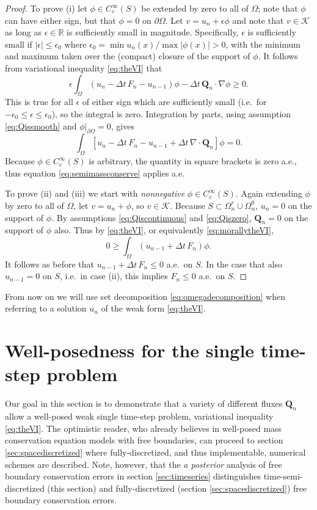 \documentclass[final,leqno,onefignum,onetabnum]{siamltex1213bueler}
\newcommand\bQ{\mathbf{Q}}
\newcommand{\Div}{\nabla\cdot}
\newcommand\eps{\epsilon}
\renewcommand{\grad}{\nabla}
\newcommand\RR{\mathbb{R}}
\begin{document}
\medskip
\begin{proof}  To prove (i) let $\phi\in C_c^\infty(S)$ be extended by zero to all of $\Omega$; note that $\phi$ can have either sign, but that $\phi=0$ on $\partial\Omega$.  Let $v = u_n + \eps \phi$ and note that $v \in \mathcal{K}$ as long as $\eps\in\RR$ is sufficiently small in magnitude.  Specifically, $\eps$ is sufficiently small if $|\eps|\le \eps_0$ where $\eps_0 = \min u_n(x) / \max |\phi(x)| > 0$, with the minimum and maximum taken over the (compact) closure of the support of $\phi$.  It follows from variational inequality \eqref{eq:theVI} that
   $$\eps \int_\Omega \left(u_n - \Delta t\,F_n - u_{n-1}\right)\phi - \Delta t\,\bQ_n \cdot \grad \phi \ge 0.$$
This is true for all $\eps$ of either sign which are sufficiently small (i.e.~for $-\eps_0 \le \eps \le \eps_0$), so the integral is zero.  Integration by parts, using assumption \eqref{eq:Qissmooth} and $\phi\big|_{\partial\Omega}=0$, gives
   $$\int_\Omega \left[ u_n - \Delta t\,F_n - u_{n-1} + \Delta t\,\Div\bQ_n \right]\phi = 0.$$
Because $\phi\in C_c^\infty(S)$ is arbitrary, the quantity in square brackets is zero a.e., thus equation \eqref{eq:semimassconserve} applies a.e.

To prove (ii) and (iii) we start with \emph{nonnegative} $\phi\in C_c^\infty(S)$.  Again extending $\phi$ by zero to all of $\Omega$, let $v = u_n + \phi$, so $v\in\mathcal{K}$.  Because $S\subset \Omega_n^r\cup\Omega_n^0$, $u_n=0$ on the support of $\phi$.  By assumptions \eqref{eq:Qiscontinuous} and \eqref{eq:Qiszero}, $\bQ_n=0$ on the support of $\phi$ also.  Thus by \eqref{eq:theVI}, or equivalently \eqref{eq:morallytheVI},
    $$0 \ge \int_{\Omega} \left(u_{n-1} + \Delta t\, F_n\right) \phi.$$
It follows as before that $u_{n-1} + \Delta t\, F_n \le 0$ a.e.~on $S$.  In the case that also $u_{n-1}=0$ on $S$, i.e.~in case (ii), this implies $F_n \le 0$ a.e.~on $S$.\end{proof}

\medskip
From now on we will use set decomposition \eqref{eq:omegadecomposition} when referring to a solution $u_n$ of the weak form \eqref{eq:theVI}.


\section{Well-posedness for the single time-step problem} \label{sec:wellposed}  Our goal in this section is to demonstrate that a variety of different fluxes $\bQ_n$ allow a well-posed weak single time-step problem, variational inequality \eqref{eq:theVI}.  The optimistic reader, who already believes in well-posed mass conservation equation models with free boundaries, can proceed to section \ref{sec:spacediscretized} where fully-discretized, and thus implementable, numerical schemes are described.  Note, however, that the \emph{a posterior} analysis of free boundary conservation errors in section \ref{sec:timeseries} distinguishes time-semi-discretized (this section) and fully-discretized (section \ref{sec:spacediscretized}) free boundary conservation errors.
\end{document}
